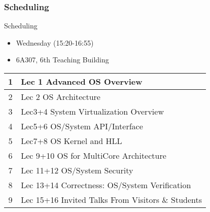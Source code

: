 %
%
\begin{frame}[t]
	\frametitle{Scheduling}

\large
Scheduling
\begin{itemize}
	
	\item Wednesday (15:20-16:55)　
	\item 6A307, 6th Teaching Building

\end{itemize}
\begin{table}[]
	\begin{tabular}{|c|l|}
		\hline
		1 & Lec 1 Advanced OS Overview                        \\ \hline
		2 & Lec 2 OS Architecture                             \\ \hline
		3 & Lec3+4  System Virtualization Overview            \\ \hline
		4 & Lec5+6  OS/System API/Interface                   \\ \hline
		5 & Lec7+8 OS Kernel and HLL                          \\ \hline
		6 & Lec 9+10 OS for MultiCore Architecture            \\ \hline
		7 & Lec 11+12 OS/System Security                      \\ \hline
		8 & Lec 13+14  Correctness: OS/System Verification    \\ \hline
		9 & Lec 15+16 Invited Talks From Visitors \& Students \\ \hline
	\end{tabular}
\end{table}

\end{frame}

